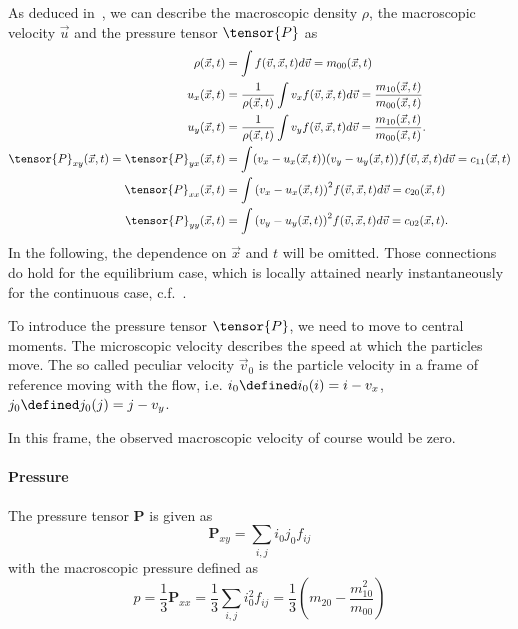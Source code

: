 As deduced in~\cite[pages 23 ff.]{harris2004introduction}, we can describe the macroscopic density $\rho$, the macroscopic velocity $\vec{u}$ and the pressure tensor $\tensor{P}$ as
\begin{equation}
  \begin{aligned}
    \rho(\vec{x},t) & = \int f (\vec{v},\vec{x},t) d\vec{v} = m_{00}(\vec{x},t) \\
    u_x(\vec{x},t)
    & = \frac{1}{\rho(\vec{x},t)}\int v_x f(\vec{v},\vec{x},t) d\vec{v} = \frac{ m_{10}(\vec{x},t) }{ m_{00}(\vec{x},t) }\\
    u_y(\vec{x},t)
    & = \frac{1}{\rho(\vec{x},t)}\int v_y f(\vec{v},\vec{x},t) d\vec{v} = \frac{ m_{10}(\vec{x},t) }{ m_{00}(\vec{x},t) }.\\
    \tensor{P}_{xy}(\vec{x},t)=\tensor{P}_{yx}(\vec{x},t)
    & = \int (v_x - u_x(\vec{x},t))(v_y - u_y(\vec{x},t)) f(\vec{v},\vec{x},t) d\vec{v}
      = c_{11} (\vec{x},t)\\
    \tensor{P}_{xx}(\vec{x},t)
    & = \int {(v_x - u_x(\vec{x},t))}^2 f(\vec{v},\vec{x},t) d\vec{v}
      = c_{20} (\vec{x},t)\\
    \tensor{P}_{yy}(\vec{x},t)
    & = \int {(v_y - u_y(\vec{x},t))}^2 f(\vec{v},\vec{x},t) d\vec{v}
      = c_{02} (\vec{x},t).
  \end{aligned}
\end{equation}
In the following, the dependence on $\vec{x}$ and $t$ will be omitted.
Those connections do hold for the equilibrium case, which is locally attained nearly instantaneously for the continuous case, c.f.~\cite[page 218]{smits2000physical}.

To introduce the pressure tensor $\tensor{P}$, we need to move to central moments.
The microscopic velocity describes the speed at which the particles move. The so called  peculiar velocity $\vec{v}_0$ is the particle velocity in a frame of reference moving with the flow, i.e. $i_0 \defined i_0(i) = i-v_x$, $j_0 \defined j_0(j) = j-v_y$.

In this frame, the observed macroscopic velocity of course would be zero.

\paragraph{Pressure}
\label{par:Pressure}
The pressure tensor $\mathbf{P}$ is given as
\begin{equation}
  \mathbf{P}_{xy} = \sum_{i,j} i_0 j_0 f_{ij}
\end{equation}
with the macroscopic pressure defined as
\begin{equation}
  \label{eq:pressure}
  p = \frac{1}{3}\mathbf{P}_{xx} = \frac{1}{3}\sum_{i,j} i_0^2 f_{ij} = \frac{1}{3} \left(m_{20} - \frac{ m_{10}^2 }{ m_{00} } \right)
\end{equation}
